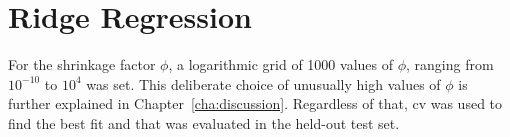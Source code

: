 \section{Ridge Regression}
\label{sec:met-ridge}

For the shrinkage factor $\phi$, a logarithmic grid of 1000 values of  $\phi$, ranging from $10^{-10} $ to $10^4$ was set. This deliberate choice of  unusually high values of $\phi$ is further explained in Chapter~\ref{cha:discussion}. Regardless of that, \acrshort{cv} was used to find the best fit and that was evaluated in the held-out test set.
